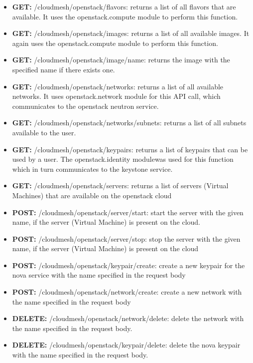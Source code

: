 \begin{itemize}
\item \textbf{GET:} /cloudmesh/openstack/flavors: returns a list of all
flavors that are available. It uses the openstack.compute module to
perform this function.

\item \textbf{GET:} /cloudmesh/openstack/images: returns a list of all
available images. It again uses the openstack.compute module to
perform this function.

\item \textbf{GET:} /cloudmesh/openstack/image/{name}: returns the image
with the specified name if there exists one.

\item \textbf{GET:} /cloudmesh/openstack/networks: returns a list of all
available networks. It uses openstack.network module for this API
call, which communicates to the openstack neutron service.

\item \textbf{GET:} /cloudmesh/openstack/networks/subnets: returns a list of
all subnets available to the user.

\item \textbf{GET:} /cloudmesh/openstack/keypairs: returns a list of keypairs
that can be used by a user. The openstack.identity modulewas used for
this function which in turn communicates to the keystone service.

\item \textbf{GET:} /cloudmesh/openstack/servers: returns a list of servers
(Virtual Machines) that are available on the openstack cloud

\item \textbf{POST:} /cloudmesh/openstack/server/start: start the server with
the given name, if the server (Virtual Machine) is present on the
cloud.

\item \textbf{POST:} /cloudmesh/openstack/server/stop: stop the server with
the given name, if the server (Virtual Machine) is present on the
cloud

\item \textbf{POST:} /cloudmesh/openstack/keypair/create: create a new keypair
 for the nova service with the name specified in the request body

\item \textbf{POST:} /cloudmesh/openstack/network/create: create a new network
 with the name specified in the request body

\item \textbf{DELETE:} /cloudmesh/openstack/network/delete: delete the network
 with the name specified in the request body.

\item \textbf{DELETE:} /cloudmesh/openstack/keypair/delete: delete the nova
keypair with the name specified in the request body.

\end{itemize}


